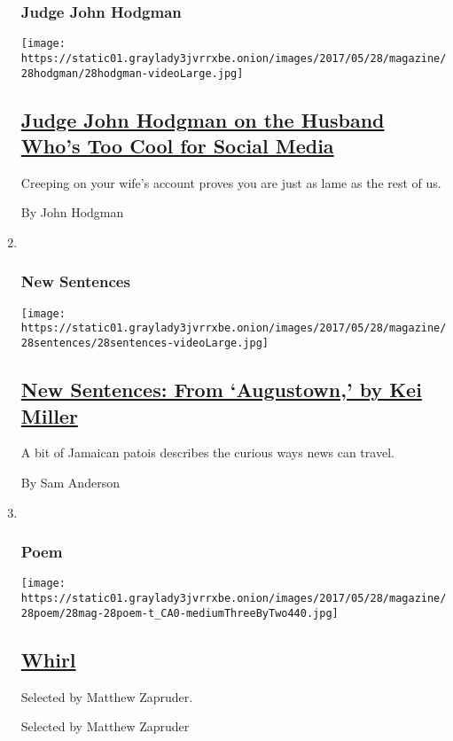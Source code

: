 \begin{enumerate}
{  \subsubsection{Judge John Hodgman}\label{judge-john-hodgman}}

  \texttt{[image: https://static01.graylady3jvrrxbe.onion/images/2017/05/28/magazine/28hodgman/28hodgman-videoLarge.jpg]}

  \hypertarget{judge-john-hodgman-on-the-husband-whos-too-cool-for-social-media}{%
  \subsection{\texorpdfstring{\href{/2017/05/26/magazine/judge-john-hodgman-on-the-husband-whos-too-cool-for-social-media.html}{Judge
  John Hodgman on the Husband Who's Too Cool for Social
  Media}}{Judge John Hodgman on the Husband Who's Too Cool for Social Media}}\label{judge-john-hodgman-on-the-husband-whos-too-cool-for-social-media}}

  Creeping on your wife's account proves you are just as lame as the
  rest of us.

  By John Hodgman
\item ~
  \hypertarget{new-sentences}{%
  \subsubsection{New Sentences}\label{new-sentences}}

  \texttt{[image: https://static01.graylady3jvrrxbe.onion/images/2017/05/28/magazine/28sentences/28sentences-videoLarge.jpg]}

  \hypertarget{new-sentences-from-augustown-by-kei-miller}{%
  \subsection{\texorpdfstring{\href{/2017/05/23/magazine/new-sentences-from-augustown-by-kei-miller.html}{New
  Sentences: From `Augustown,' by Kei
  Miller}}{New Sentences: From `Augustown,' by Kei Miller}}\label{new-sentences-from-augustown-by-kei-miller}}

  A bit of Jamaican patois describes the curious ways news can travel.

  By Sam Anderson
\item ~
  \hypertarget{poem}{%
  \subsubsection{Poem}\label{poem}}

  \texttt{[image: https://static01.graylady3jvrrxbe.onion/images/2017/05/28/magazine/28poem/28mag-28poem-t\_CA0-mediumThreeByTwo440.jpg]}

  \hypertarget{whirl}{%
  \subsection{\texorpdfstring{\href{/2017/05/26/magazine/whirl.html}{Whirl}}{Whirl}}\label{whirl}}

  Selected by Matthew Zapruder.

  Selected by Matthew Zapruder
\end{enumerate}

